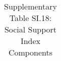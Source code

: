 \begin{longtable}{llcccccccccc}
\caption{Supplementary Table SI.18: Social Support Index Components} \label{tab:pap__c2_1} \\                                                                                                                                                                                                                                                                                                                                                                                                                                                                                                                                                                                                                                                                                                                                                                                             
\hline \hline                                                                                                                                                                                                                                                                                                                                                                                                                                                                                                                                                                                                                                                                                                                                                                                                                                                                             

\end{longtable}

